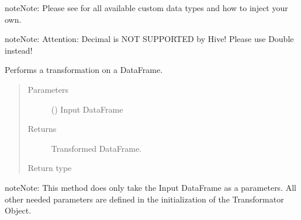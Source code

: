 \documentclass[a4paper,10pt, twoside,english]{sphinxmanual}
\begin{document}
\begin{fulllineitems}
\begin{sphinxadmonition}{note}{Note:}
Please see {\hyperref[\detokenize{transformer/mapper:module-spooq2.transformer.mapper_custom_data_types}]{}} for all available custom
data types and how to inject your own.
\end{sphinxadmonition}

\begin{sphinxadmonition}{note}{Note:}
Attention: Decimal is NOT SUPPORTED by Hive! Please use Double instead!
\end{sphinxadmonition}

\begin{fulllineitems}
\label{\detokenize{transformer/mapper:spooq2.transformer.mapper.Mapper.transform}}
Performs a transformation on a DataFrame.
\begin{quote}\begin{description}
\item[{Parameters}] \leavevmode
{} () \textendash{} Input DataFrame

\item[{Returns}] \leavevmode
Transformed DataFrame.

\item[{Return type}] \leavevmode
{}

\end{description}\end{quote}

\begin{sphinxadmonition}{note}{Note:}
This method does only take the Input DataFrame as a parameters. All other needed parameters
are defined in the initialization of the Transformator Object.
\end{sphinxadmonition}

\end{fulllineitems}


\end{fulllineitems}
\end{document}
